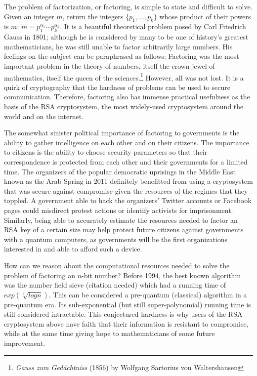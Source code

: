 The problem of factorization, or factoring,
is simple to state and difficult to solve.
Given an integer $m$, return the integers $\{p_1, \ldots, p_k\}$ whose
product of their powers is $m$: $m = p_1^{\alpha_1}\cdots p_k^{\alpha_k}$.
It is a beautiful theoretical problem posed by Carl Friedrich Gauss in 1801;
although he is considered by many to be one of history's greatest mathematicians,
he was still unable to factor arbitrarily large numbers. 
His feelings on the subject can be paraphrased as follows:
Factoring was the most important problem in the theory of
numbers, itself the crown jewel of mathematics, itself
the queen of the sciences.\footnote{\emph{Gauss zum Ged\"achtniss} (1856) by Wolfgang Sartorius von Waltershausen}
However, all was not lost.
It is a quirk of cryptography that the hardness of problems can be used
to secure communication. Therefore, factoring also has immense practical
usefulness as the basis of the RSA cryptosystem, the most widely-used
cryptosystem around the world and on the internet.

The somewhat sinister political importance of factoring to
governments is the ability to gather intelligence on each other and on their
citizens. The importance to citizens is the ability to choose security
parameters so that their correspondence is protected from each other and
their governments for a limited time.
The organizers of the popular democratic uprisings in the Middle East known
as the Arab Spring in 2011 definitely benefitted from using a cryptosystem that was
secure against compromise given the resources of the regimes that they toppled.
A government able to hack the organizers' Twitter accounts or Facebook pages
could misdirect protest actions or identify activists for imprisonment.
Similarly, being able to accurately estimate the resources needed to factor
an RSA key of a certain size may help protect future citizens against
governments with a quantum computers, as governments will be the first
organizations interested in and able to afford such a device.

How can we reason about the computational resources needed to solve the
problem of factoring an $n$-bit number?
Before 1994, the best known algorithm was the
number field sieve (citation needed) which had a running time of
$exp(\sqrt[3]{log n})$. This can be considered a pre-quantum (classical)
algorithm in a pre-quantum era. Its sub-exponential (but still super-polynomial)
running time is still considered intractable.
This conjectured hardness is why users of the RSA cryptosystem above have faith
that their information is resistant to compromise, while at the same time
giving hope to mathematicians of some future improvement.

